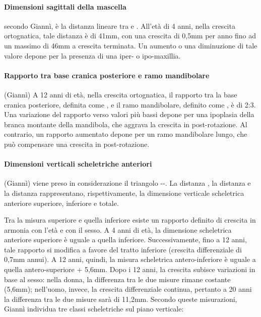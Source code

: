 \paragraph{Dimensioni sagittali della mascella} secondo Giannì, è la distanza lineare tra  e . All'età di 4 anni, nella crescita ortognatica, tale distanza è di 41mm, con una crescita di 0,5mm per anno fino ad un massimo di 46mm a crescita terminata. Un aumento o una diminuzione di tale valore depone per la presenza di una iper- o ipo-maxillia.

\paragraph{Rapporto tra base cranica posteriore e ramo mandibolare} (Giannì) A 12 anni di età, nella crescita ortognatica, il rapporto tra la base cranica posteriore, definita come , e il ramo mandibolare, definito come , è di 2:3. Una variazione del rapporto verso valori più bassi depone per una ipoplasia della branca montante della mandibola, che aggrava la crescita in post-rotazione. Al contrario, un rapporto aumentato depone per un ramo mandibolare lungo, che può compensare una crescita in post-rotazione.

\paragraph{Dimensioni verticali scheletriche anteriori} (Giannì) viene preso in considerazione il triangolo --. La distanza , la distanza  e la distanza  rappresentano, rispettivamente, la dimensione verticale scheletrica anteriore superiore, inferiore e totale.

Tra la misura superiore e quella inferiore esiste un rapporto definito di crescita in armonia con l'età e con il sesso. A 4 anni di età, la dimensione scheletrica anteriore superiore è uguale a quella inferiore. Successivamente, fino a 12 anni, tale rapporto si modifica a favore del tratto inferiore (crescita differenziale di 0,7mm annui). A 12 anni, quindi, la misura scheletrica antero-inferiore è uguale a quella antero-superiore + 5,6mm. Dopo i 12 anni, la crescita subisce variazioni in base al sesso: nella donna, la differenza tra le due misure rimane costante (5,6mm); nell'uomo, invece, la crescita differenziale continua, pertanto a 20 anni la differenza tra le due misure sarà di 11,2mm. Secondo queste misurazioni, Giannì individua tre classi scheletriche sul piano verticale:

